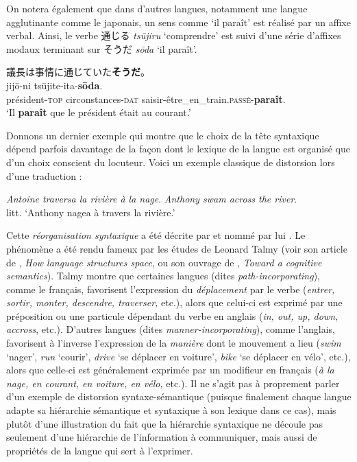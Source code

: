 {    \noindent On notera également que dans d’autres langues, notamment une langue agglutinante comme le japonais, un sens comme ‘il paraît’ est réalisé par un affixe verbal. Ainsi, le verbe {\cjkfont 通じる} \textit{tsūjiru} ‘comprendre’ est suivi d’une série d’affixes modaux terminant sur {\cjkfont そうだ} \textit{sōda} ‘il paraît’.
    
    \ea\relax
    {\cjkfont 議長は事情に通じていた\textbf{そうだ}。}\\
      {jijō-ni}  {tsūjite-ita-\textbf{sōda}}.\\
    président-\textsc{top} circonstances-\textsc{dat} saisir-être\_en\_train.\textsc{passé}-\textbf{paraît}.\\
    \glt ‘Il \textbf{paraît} que le président était au courant.’
    \z

    Donnons un dernier exemple qui montre que le choix de la tête syntaxique dépend parfois davantage de la façon dont le lexique de la langue est organisé que d’un choix conscient du locuteur. Voici un exemple classique de distorsion lors d’une traduction :\tcbbreak
    
    \ea
    \ea\textit{Antoine traversa la rivière à la nage}.
    \ex\textit{Anthony swam across the river}.\\
    litt. `Anthony nagea à travers la rivière.'\z
    \z

    Cette \textit{réorganisation syntaxique} a été décrite par \citet[chapitre 131]{tesniere1959elements} et nommé par lui . Le phénomène a été rendu fameux par les études de Leonard Talmy (voir son article de \citeyear{talmy1983language}, \textit{How language structures space}, ou son ouvrage de \citeyear{talmy2000toward}, \textit{Toward a cognitive semantics}). Talmy montre que certaines langues (dites \textit{path-incorporating}), comme le français, {favorisent} l'expression du \textit{déplacement}  par le verbe (\textit{entrer, sortir, monter, descendre, traverser,} etc.), alors que celui-ci est exprimé par une préposition ou une particule dépendant du verbe en anglais (\textit{in, out, up, down, accross}, etc.). D’autres langues (dites \textit{manner-incorporating}), comme l’anglais, {favorisent à l’inverse} l'expression de la \textit{manière}  dont le mouvement a lieu (\textit{swim} ‘nager’, \textit{run} ‘courir’, \textit{drive} ‘se déplacer en voiture’, \textit{bike} ‘se déplacer en vélo’, etc.), alors que celle-ci est généralement exprimée par un modifieur en français (\textit{à la nage, en courant, en voiture, en vélo,} etc.). Il ne s’agit pas à proprement parler d’un exemple de distorsion syntaxe-sémantique (puisque finalement chaque langue adapte sa hiérarchie sémantique et syntaxique à son lexique dans ce cas), mais plutôt d’une illustration du fait que la hiérarchie syntaxique ne découle pas seulement d’une hiérarchie de l’information à communiquer, mais aussi de propriétés de la langue qui sert à l’exprimer.
}

